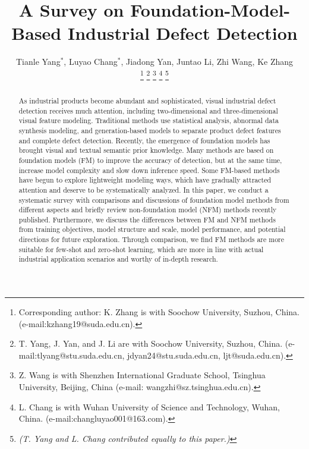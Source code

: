 \documentclass[journal,comsoc]{IEEEtran}
\begin{document}
\title{A Survey on Foundation-Model-Based Industrial Defect Detection}


\author{Tianle Yang$^{*}$, Luyao Chang$^{*}$, Jiadong Yan, Juntao Li, Zhi Wang, Ke Zhang

\thanks{Corresponding author: K. Zhang is with  Soochow University, Suzhou, China. (e-mail:kzhang19@suda.edu.cn).}
\thanks{T. Yang, J. Yan, and J. Li are with Soochow University, Suzhou, China. (e-mail:tlyang@stu.suda.edu.cn, jdyan24@stu.suda.edu.cn, ljt@suda.edu.cn).}
\thanks{Z. Wang is with Shenzhen International Graduate School, Tsinghua University, Beijing, China (e-mail: wangzhi@sz.tsinghua.edu.cn).}
\thanks{L. Chang is with Wuhan University of Science and Technology, Wuhan, China. (e-mail:changluyao001@163.com).}
\thanks{\textit{(T. Yang  and L. Chang contributed equally to this paper.)}}
}




        
        






\maketitle


\begin{abstract}
As industrial products become abundant and sophisticated, visual industrial defect detection receives much attention, including two-dimensional and three-dimensional visual feature modeling. Traditional methods use statistical analysis, abnormal data synthesis modeling, and generation-based models to separate product defect features and complete defect detection. Recently, the emergence of foundation models has brought visual and textual semantic prior knowledge. Many methods are based on foundation models (FM) to improve the accuracy of detection, but at the same time, increase model complexity and slow down inference speed. Some FM-based methods have begun to explore lightweight modeling ways, which have gradually attracted attention and deserve to be systematically analyzed. In this paper, we conduct a systematic survey with comparisons and discussions of foundation model methods from different aspects and briefly review non-foundation model (NFM) methods recently published. Furthermore, we discuss the differences between FM and NFM methods from training objectives, model structure and scale, model performance, and potential directions for future exploration. Through comparison, we find FM methods are more suitable for few-shot and zero-shot learning, which are more in line with actual industrial application scenarios and worthy of in-depth research.
\end{abstract}
\end{document}
